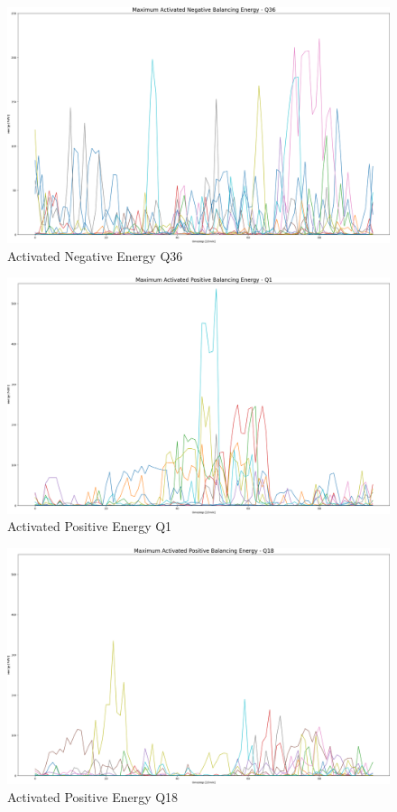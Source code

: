 \begin{figure}[H]
	\centering
	\includegraphics[width=1\linewidth]{pictures/results/Activated_negEnergy_Q36.png}
	\caption{Activated Negative Energy Q36}
	\label{fig:_negEnergy_Q36}
\end{figure}

\begin{figure}[H]
	\includegraphics[width=1\linewidth]{pictures/results/Activated_posEnergy_Q1.png}
	\caption{Activated Positive Energy Q1}
	\label{fig:_posEnergy_Q1}
\end{figure}

\begin{figure}[H]
	\includegraphics[width=1\linewidth]{pictures/results/Activated_posEnergy_Q18.png}
	\caption{Activated Positive Energy Q18}
	\label{fig:_posEnergy_Q18}
\end{figure}

